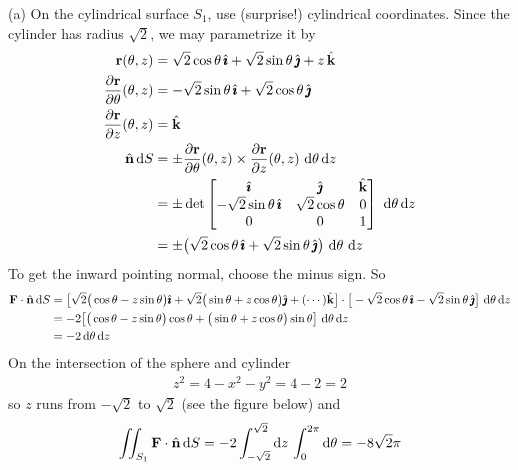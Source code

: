 \begin{solution} 
(a)
On the cylindrical surface $S_1$, use (surprise!) cylindrical coordinates.
Since the cylinder has radius $\sqrt{2}$, we may parametrize it by
\begin{align*}
\vr(\theta,z) &= \sqrt{2}\cos\theta\,\hi + \sqrt{2}\sin\theta\,\hj + z\,\hk \\
\pdiff{\vr}{\theta}(\theta,z) 
   &= -\sqrt{2}\sin\theta\,\hi + \sqrt{2}\cos\theta\,\hj  \\
\pdiff{\vr}{z}(\theta,z) 
   &= \hk  \\
\hn\,\dee{S} &= \pm \pdiff{\vr}{\theta}(\theta,z)\times
                \pdiff{\vr}{z}(\theta,z)\ \dee{\theta}\, \dee{z} \\
        &=\pm\det\left[\begin{matrix} \hi & \hj &\hk \\
                          -\sqrt{2}\sin\theta\,\hi & \sqrt{2}\cos\theta & 0 \\
                            0 & 0 & 1 
                   \end{matrix}\right]\ \dee{\theta}\, \dee{z} \\
        &= \pm\big(\sqrt{2}\cos\theta\,\hi+\sqrt{2}\sin\theta\,\hj\big)\ 
                                   \dee{\theta}\ \dee{z}
\end{align*}
To get the inward pointing normal, choose the minus sign. So
\begin{align*}
\vF\cdot\hn\,\dee{S}
&=
\big[\sqrt{2}\big(\cos\theta-z\sin\theta\big)\hi
      + \sqrt{2}\big(\sin\theta+z\cos\theta\big)\hj
      + (\cdots)\hk\big]\cdot
\big[-\sqrt{2}\cos\theta\,\hi-\sqrt{2}\sin\theta\,\hj\big]\ \dee{\theta}\, \dee{z}
\\
&=-2\big[\big(\cos\theta-z\sin\theta\big)\cos\theta
+\big(\sin\theta+z\cos\theta\big)\sin\theta\big]\ \dee{\theta}\, \dee{z}\\
&=-2\, \dee{\theta}\, \dee{z}
\end{align*}
On the intersection of the sphere and cylinder 
\begin{align*}
z^2=4-x^2-y^2 = 4-2=2
\end{align*}
so $z$ runs from $-\sqrt{2}$ to $\sqrt{2}$ (see the figure below)
and
\begin{align*}
\iint_{S_1}\mathbf{F}\cdot \hat{\mathbf{n}}\,\mathrm{d}S
=-2\int_{-\sqrt{2}}^{\sqrt{2}}\mathrm{d}z\,\int_0^{2\pi}\mathrm{d}\theta
=-8\sqrt{2}\pi
\end{align*}


\end{solution}
